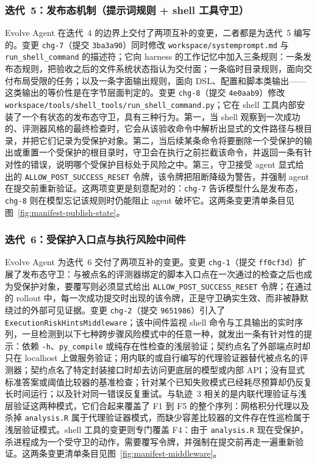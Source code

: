 
\FloatBarrier

\subsubsection{迭代~5：发布态机制（提示词规则 + shell 工具守卫）}
\label{app:case-study:changes:iter5}

Evolve Agent 在迭代~4 的边界上交付了两项互补的变更，二者都是为迭代~5 编写的。变更 \texttt{chg-7}（提交 \texttt{3ba3a90}）同时修改 \texttt{workspace/systemprompt.md} 与 \texttt{run\_shell\_command} 的描述符；它向 harness 的工作记忆中加入三条规则：一条发布态规则，把验收之后的文件系统状态指认为交付面；一条临时目录规则，面向交付布局受限的任务；以及一条字面输出规则，面向 DSL、配置和脚本类输出——这类输出的等价性是在字节层面判定的。变更 \texttt{chg-8}（提交 \texttt{4e0aab9}）修改 \texttt{workspace/tools/shell\_tools/run\_shell\_command.py}；它在 shell 工具内部安装了一个有状态的发布态守卫，具有三种行为。第一，当 shell 观察到一次成功的、评测器风格的最终检查时，它会从该验收命令中解析出显式的文件路径与根目录，并把它们记录为受保护对象。第二，当后续某条命令将要删除一个受保护的输出或重置一个受保护的根目录时，守卫会在执行之前拦截该命令，并返回一条有针对性的错误，说明哪个受保护目标处于风险之中。第三，守卫接受 agent 显式给出的 \texttt{ALLOW\_POST\_SUCCESS\_RESET} 令牌，该令牌把阻断降级为警告，并强制 agent 在提交前重新验证。这两项变更是刻意配对的：\texttt{chg-7} 告诉模型什么是发布态，\texttt{chg-8} 则在模型忘记该规则时仍能阻止 agent 破坏它。这两条变更清单条目见图~\ref{fig:manifest-publish-state}。


\FloatBarrier

\subsubsection{迭代~6：受保护入口点与执行风险中间件}
\label{app:case-study:changes:iter6}

Evolve Agent 为迭代~6 交付了两项互补的变更。变更 \texttt{chg-1}（提交 \texttt{ff0cf3d}）扩展了发布态守卫：与被点名的评测器绑定的脚本入口点在一次通过的检查之后也成为受保护对象，要覆写则必须显式给出 \texttt{ALLOW\_POST\_SUCCESS\_RESET} 令牌；在通过的 rollout 中，每一次成功提交时出现的该令牌，正是守卫确实生效、而非被静默绕过的外部可见证据。变更 \texttt{chg-2}（提交 \texttt{9651986}）引入了 \texttt{ExecutionRiskHintsMiddleware}；该中间件监视 shell 命令与工具输出的实时序列，一旦检测到以下七种跨步骤风险模式中的任意一种，就发出一条有针对性的提示：依赖 \texttt{-h}、\texttt{py\_compile} 或纯存在性检查的浅层验证；契约点名了外部端点时却只在 localhost 上做服务验证；用内联的或自行编写的代理验证器替代被点名的评测器；契约点名了特定封装接口时却去访问更底层的模型或内部 API；没有显式标准答案或阈值比较器的基准检查；针对某个已知失败模式已经耗尽预算却仍反复长时间运行；以及针对同一错误反复重试。与轨迹~3 相关的是内联代理验证与浅层验证这两种模式，它们合起来覆盖了 F1 到 F5 的整个序列：网格积分代理以及杀掉 \texttt{analysis.R} 属于代理验证器模式，而缺少容差比较器的文件存在性巡检属于浅层验证模式。shell 工具的变更则专门覆盖 F4：由于 \texttt{analysis.R} 现在受保护，杀进程成为一个受守卫的动作，需要覆写令牌，并强制在提交前再走一遍重新验证。这两条变更清单条目见图~\ref{fig:manifest-middleware}。

